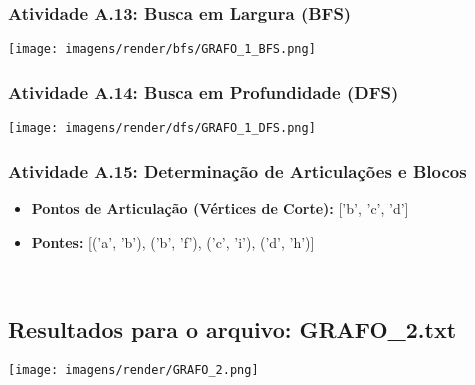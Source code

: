 \documentclass[a4paper,12pt]{article}
\begin{document}
\subsubsection*{Atividade A.13: Busca em Largura (BFS)}
\begin{center}
    \texttt{[image: imagens/render/bfs/GRAFO\_1\_BFS.png]}
\end{center}

\subsubsection*{Atividade A.14: Busca em Profundidade (DFS)}
\begin{center}
    \texttt{[image: imagens/render/dfs/GRAFO\_1\_DFS.png]}
\end{center}

\subsubsection*{Atividade A.15: Determinação de Articulações e Blocos}
\begin{itemize}[nosep, leftmargin=*]
    \item \textbf{Pontos de Articulação (Vértices de Corte):} ['b', 'c', 'd']
    \item \textbf{Pontes:} [('a', 'b'), ('b', 'f'), ('c', 'i'), ('d', 'h')]
\end{itemize}

\\ 

\subsection{Resultados para o arquivo: GRAFO\_2.txt}

\begin{center}
    \texttt{[image: imagens/render/GRAFO\_2.png]}
\end{center}
\end{document}
